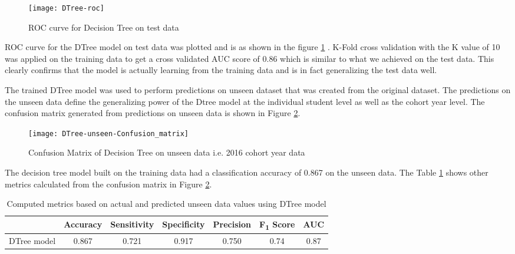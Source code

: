 \documentclass[11pt,openright]{report}
\begin{document}
 \begin{figure}[!htbp]
	\centering
	\texttt{[image: DTree-roc]}
	\caption{ROC curve for Decision Tree on test data}
	\label{fig:DTree_roc}
\end{figure} 

ROC curve for the DTree model on test data was plotted and is as shown in the figure \ref{fig:DTree_roc} . K-Fold cross validation with the K value of 10 was applied on the training data to get a cross validated AUC score of 0.86 which is similar to what we achieved on the test data. This clearly confirms that the model is actually learning from the training data and is in fact generalizing the test data well.

The trained DTree model was used to perform predictions on unseen dataset that was created from the original dataset. The predictions on the unseen data define the generalizing power of the Dtree model at the individual student level as well as the cohort year level. The confusion matrix generated from predictions on unseen data is shown in Figure \ref{fig:DTree_unseen_confusion_matrix}.

  \begin{figure}[!htb]
	\centering
	\texttt{[image: DTree-unseen-Confusion\_matrix]}
	\caption{Confusion Matrix of Decision Tree on unseen data i.e. 2016 cohort year data}
	\label{fig:DTree_unseen_confusion_matrix}
\end{figure} 


The decision tree model built on the training data had a classification accuracy of 0.867 on the unseen data. The Table \ref{table:DTree-unseen_metrics_db} shows other metrics calculated from the confusion matrix in Figure \ref{fig:DTree_unseen_confusion_matrix}.

\begin{table}[!htb]
	\renewcommand{\arraystretch}{1.3}
	\caption{Computed metrics based on actual and predicted unseen data values using DTree model}
	\label{table:DTree-unseen_metrics_db}
	\centering
	\begin{tabular}{|c|c|c|c|c|c|c|}
    \hline
  	 & \bfseries Accuracy & \bfseries Sensitivity & \bfseries Specificity & \bfseries Precision & \bfseries F\textsubscript{1} Score  & \bfseries AUC\\  
    \hline
	DTree model & 0.867 & 0.721 & 0.917 & 0.750 & 0.74 & 0.87 \\ \hline
	\end{tabular} 
\end{table}
\end{document}
